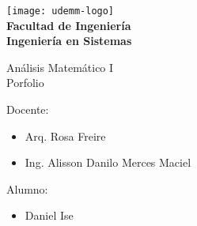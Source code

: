 \begin{titlepage}
	\begin{center}
		\vspace*{0.5cm}
		\texttt{[image: udemm-logo]}\\
		\vspace{0.2cm}
		\Large
		\textbf{Facultad de Ingeniería}\\
		\textbf{Ingeniería en Sistemas}\\
		\vspace{2cm}

		\Huge
		Análisis Matemático I\\
		Porfolio
		\vfill

		\raggedright
		\Large
		Docente:
		\begin{itemize}
			\item[] Arq. Rosa Freire\\
			\item[] Ing. Alisson Danilo Merces Maciel\\
		\end{itemize}
		Alumno:
		\begin{itemize}
			\item[] Daniel Ise
		\end{itemize}
		\vspace{1cm}

	\end{center}
\end{titlepage}
